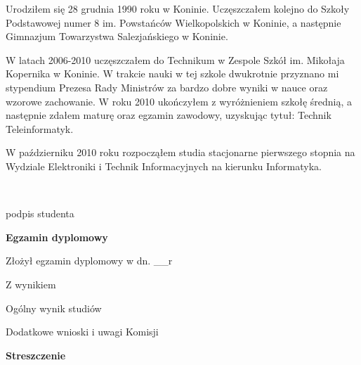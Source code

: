 \begin{titlepage}
    \indent 
    Urodziłem się 28 grudnia 1990 roku w Koninie. Uczęszczałem
    kolejno do Szkoły Podstawowej numer 8 im. Powstańców
    Wielkopolskich w Koninie, a następnie Gimnazjum Towarzystwa
    Salezjańskiego w Koninie.

    \par
    \indent 
    W latach 2006-2010 uczęszczałem do Technikum w Zespole
    Szkół im. Mikołaja Kopernika w Koninie. W trakcie nauki w tej
    szkole dwukrotnie przyznano mi stypendium Prezesa Rady Ministrów
    za bardzo dobre wyniki w nauce oraz wzorowe zachowanie.  W roku
    2010 ukończyłem z wyróżnieniem szkołę średnią, a następnie zdałem
    maturę oraz egzamin zawodowy, uzyskując tytuł: Technik
    Teleinformatyk.

    \par
    \indent
    W październiku 2010 roku rozpocząłem studia stacjonarne pierwszego stopnia na Wydziale Elektroniki
    i Technik Informacyjnych na kierunku Informatyka.

    \vspace{2\baselineskip}
    \hfill\parbox{15em}{{\small\dotfill}\\[-.3ex]
    \centerline{\footnotesize podpis studenta}}\par
    \vspace{2\baselineskip}
    \begin{center}
 	{\large\bfseries Egzamin dyplomowy} \par\bigskip\bigskip
    \end{center}
    \par\noindent\vspace{1.5\baselineskip}
    Złożył egzamin dyplomowy w dn. \_\_r
    \par\noindent\vspace{1.5\baselineskip}
    Z wynikiem \dotfill
    \par\noindent\vspace{1.5\baselineskip}
    Ogólny wynik studiów \dotfill
    \par\noindent\vspace{1.5\baselineskip}
    Dodatkowe wnioski i uwagi Komisji \dotfill
    \par\noindent\vspace{1.5\baselineskip}
    \dotfill

    \newpage\thispagestyle{empty}
    \vspace*{2\baselineskip}
    \begin{center}
	{\large\bfseries Streszczenie}\par\bigskip
    \end{center}


\end{titlepage}

